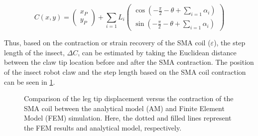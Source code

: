 \begin{equation}\label{eq:C}
  C(x,y) = \begin{pmatrix} x_P \\ y_P \end{pmatrix} + \sum_{i=1}L_i\begin{pmatrix} \cos(-\frac{\pi}{2}-\theta+\sum_{i=1}\alpha_i) \\ \sin(-\frac{\pi}{2}-\theta+\sum_{i=1}\alpha_i) \end{pmatrix}
\end{equation}

Thus, based on the contraction or strain recovery of the SMA coil ($\varepsilon$), the step length of the insect, $\Delta C$, can be estimated by taking the Euclidean distance between the claw tip location before and after the SMA contraction. The position of the insect robot claw and the step length based on the SMA coil contraction can be seen in \cref{fig:insect-am-fem-compare}.

\begin{figure}[hb!] %
  \centering
  \resizebox{0.95\columnwidth}{!}{}
  \caption{Comparison of the leg tip displacement versus the contraction of the SMA coil between the analytical model (AM) and Finite Element Model (FEM) simulation. Here, the dotted and filled lines represent the FEM results and analytical model, respectively.}
  \label{fig:insect-am-fem-compare}
\end{figure}

